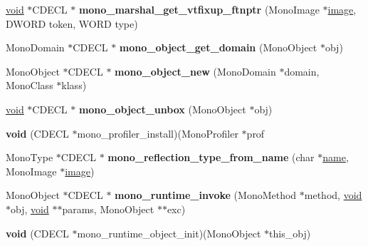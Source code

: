 \begin{DoxyCompactItemize}
\mbox{\label{structloaded__mono_a0561f556bd965d7226a9903d72be1129}} 
\hyperlink{interfacevoid}{void} $\ast$C\+D\+E\+CL $\ast$ {\bfseries mono\+\_\+marshal\+\_\+get\+\_\+vtfixup\+\_\+ftnptr} (Mono\+Image $\ast$\hyperlink{interfacevoid}{image}, D\+W\+O\+RD token, W\+O\+RD type)
\item 
\mbox{\label{structloaded__mono_a6fbd4ba28c2ebea4b9062b1e3b202806}} 
Mono\+Domain $\ast$C\+D\+E\+CL $\ast$ {\bfseries mono\+\_\+object\+\_\+get\+\_\+domain} (Mono\+Object $\ast$obj)
\item 
\mbox{\label{structloaded__mono_abf4d8495ea288dc87dee6fd3f435427c}} 
Mono\+Object $\ast$C\+D\+E\+CL $\ast$ {\bfseries mono\+\_\+object\+\_\+new} (Mono\+Domain $\ast$domain, Mono\+Class $\ast$klass)
\item 
\mbox{\label{structloaded__mono_a3977e26cdd5ef2c9be5e357a0c56c1ee}} 
\hyperlink{interfacevoid}{void} $\ast$C\+D\+E\+CL $\ast$ {\bfseries mono\+\_\+object\+\_\+unbox} (Mono\+Object $\ast$obj)
\item 
\mbox{\label{structloaded__mono_a5d25ef4d94a1e0080848846201363eca}} 
{\bfseries void} (C\+D\+E\+CL $\ast$mono\+\_\+profiler\+\_\+install)(Mono\+Profiler $\ast$prof
\item 
\mbox{\label{structloaded__mono_a93177f3f88e6c3aca1c7c60321e03129}} 
Mono\+Type $\ast$C\+D\+E\+CL $\ast$ {\bfseries mono\+\_\+reflection\+\_\+type\+\_\+from\+\_\+name} (char $\ast$\hyperlink{structname}{name}, Mono\+Image $\ast$\hyperlink{interfacevoid}{image})
\item 
\mbox{\label{structloaded__mono_a23dff8cf0946290caf0b6d020c9d9557}} 
Mono\+Object $\ast$C\+D\+E\+CL $\ast$ {\bfseries mono\+\_\+runtime\+\_\+invoke} (Mono\+Method $\ast$method, \hyperlink{interfacevoid}{void} $\ast$obj, \hyperlink{interfacevoid}{void} $\ast$$\ast$params, Mono\+Object $\ast$$\ast$exc)
\item 
\mbox{\label{structloaded__mono_a21a76adfd75c251c62cab65264303a8b}} 
{\bfseries void} (C\+D\+E\+CL $\ast$mono\+\_\+runtime\+\_\+object\+\_\+init)(Mono\+Object $\ast$this\+\_\+obj)

\end{DoxyCompactItemize}
